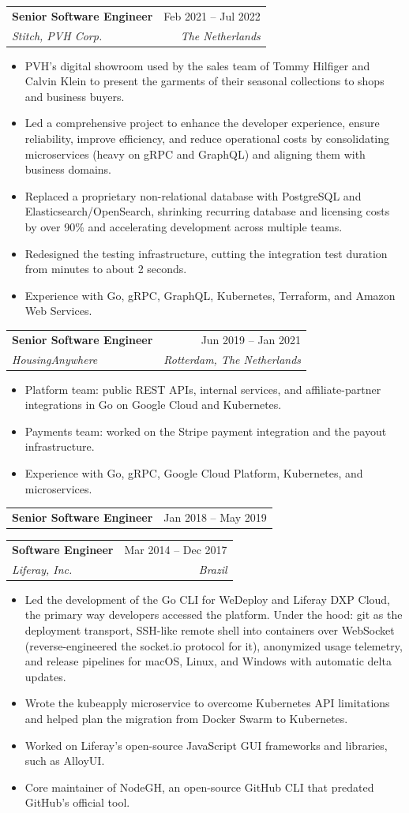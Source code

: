 \documentclass[letterpaper,12pt]{article}
\makeatletter
\newcommand{\resumeItem}[1]{
  \item
    {#1 \vspace{-2pt}}
}
\newcommand{\resumeSubheading}[4]{
  \vspace{-2pt}\item
    \begin{tabular*}{0.97\textwidth}[t]{l@{\extracolsep{\fill}}r}
      \textbf{#1} & #2 \\
      \textit{\small#3} & \textit{\small #4} \\
    \end{tabular*}\vspace{-7pt}
}
\newcommand{\resumeSubheadingExtra}[2]{
  \vspace{-2pt}\item
    \begin{tabular*}{0.97\textwidth}[t]{l@{\extracolsep{\fill}}r}
      \textbf{#1} & #2 \\
    \end{tabular*}\vspace{-2em}
}
\newcommand{\resumeLead}[1]{
  \vspace{2pt}\item[] {#1 \vspace{-2pt}}
}
\newcommand{\resumeItemListStart}{\begin{itemize}}
\newcommand{\resumeItemListEnd}{\end{itemize}}
\makeatother
\begin{document}
    \resumeSubheading
      {Senior Software Engineer}{Feb 2021 -- Jul 2022}
      {Stitch, PVH Corp.}{The Netherlands}
      \resumeItemListStart
        \resumeLead{PVH's digital showroom used by the sales team of Tommy Hilfiger and Calvin Klein to present the garments of their seasonal collections to shops and business buyers.}
        \resumeItem{Led a comprehensive project to enhance the developer experience, ensure reliability, improve efficiency, and reduce operational costs by consolidating microservices (heavy on gRPC and GraphQL) and aligning them with business domains.}
        \resumeItem{Replaced a proprietary non-relational database with PostgreSQL and Elasticsearch/OpenSearch, shrinking recurring database and licensing costs by over 90\% and accelerating development across multiple teams.}
        \resumeItem{Redesigned the testing infrastructure, cutting the integration test duration from minutes to about 2 seconds.}
        \resumeItem{Experience with Go, gRPC, GraphQL, Kubernetes, Terraform, and Amazon Web Services.}
      \resumeItemListEnd

    \resumeSubheading
      {Senior Software Engineer}{Jun 2019 -- Jan 2021}
      {HousingAnywhere}{Rotterdam, The Netherlands}
      \resumeItemListStart
        \resumeItem{Platform team: public REST APIs, internal services, and affiliate-partner integrations in Go on Google Cloud and Kubernetes.}
        \resumeItem{Payments team: worked on the Stripe payment integration and the payout infrastructure.}
        \resumeItem{Experience with Go, gRPC, Google Cloud Platform, Kubernetes, and microservices.}
      \resumeItemListEnd

    \resumeSubheadingExtra
      {Senior Software Engineer}{Jan 2018 -- May 2019}
    \resumeSubheading
      {Software Engineer}{Mar 2014 -- Dec 2017}
      {Liferay, Inc.}{Brazil}
      \resumeItemListStart
        \resumeItem{Led the development of the Go CLI for WeDeploy and Liferay DXP Cloud, the primary way developers accessed the platform. Under the hood: git as the deployment transport, SSH-like remote shell into containers over WebSocket (reverse-engineered the socket.io protocol for it), anonymized usage telemetry, and release pipelines for macOS, Linux, and Windows with automatic delta updates.}
        \resumeItem{Wrote the kubeapply microservice to overcome Kubernetes API limitations and helped plan the migration from Docker Swarm to Kubernetes.}
        \resumeItem{Worked on Liferay's open-source JavaScript GUI frameworks and libraries, such as AlloyUI.}
        \resumeItem{Core maintainer of NodeGH, an open-source GitHub CLI that predated GitHub's official tool.}
      \resumeItemListEnd
\end{document}
